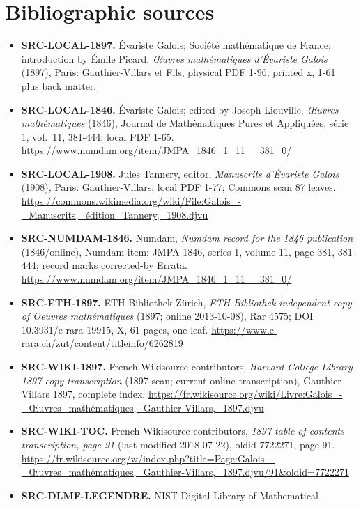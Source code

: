 \documentclass[
  10pt,
  a4paper,
]{scrreprt}
\providecommand{\tightlist}{%
  \setlength{\itemsep}{0pt}\setlength{\parskip}{0pt}}
\begin{document}
\section{Bibliographic sources}\label{bibliographic-sources}

\begin{itemize}
\tightlist
\item
  \textbf{SRC-LOCAL-1897.} Évariste Galois; Société mathématique de
  France; introduction by Émile Picard, \emph{Œuvres mathématiques
  d'Évariste Galois} (1897), Paris: Gauthier-Villars et Fils, physical
  PDF 1-96; printed x, 1-61 plus back matter.
\item
  \textbf{SRC-LOCAL-1846.} Évariste Galois; edited by Joseph Liouville,
  \emph{Œuvres mathématiques} (1846), Journal de Mathématiques Pures et
  Appliquées, série 1, vol.~11, 381-444; local PDF 1-65.
  \url{https://www.numdam.org/item/JMPA_1846_1_11__381_0/}
\item
  \textbf{SRC-LOCAL-1908.} Jules Tannery, editor, \emph{Manuscrits
  d'Évariste Galois} (1908), Paris: Gauthier-Villars, local PDF 1-77;
  Commons scan 87 leaves.
  \url{https://commons.wikimedia.org/wiki/File:Galois_-_Manuscrits,_édition_Tannery,_1908.djvu}
\item
  \textbf{SRC-NUMDAM-1846.} Numdam, \emph{Numdam record for the 1846
  publication} (1846/online), Numdam item: JMPA 1846, series 1, volume
  11, page 381, 381-444; record marks corrected-by Errata.
  \url{https://www.numdam.org/item/JMPA_1846_1_11__381_0/}
\item
  \textbf{SRC-ETH-1897.} ETH-Bibliothek Zürich, \emph{ETH-Bibliothek
  independent copy of Oeuvres mathématiques} (1897; online 2013-10-08),
  Rar 4575; DOI 10.3931/e-rara-19915, X, 61 pages, one leaf.
  \url{https://www.e-rara.ch/zut/content/titleinfo/6262819}
\item
  \textbf{SRC-WIKI-1897.} French Wikisource contributors, \emph{Harvard
  College Library 1897 copy transcription} (1897 scan; current online
  transcription), Gauthier-Villars 1897, complete index.
  \url{https://fr.wikisource.org/wiki/Livre:Galois_-_Œuvres_mathématiques,_Gauthier-Villars,_1897.djvu}
\item
  \textbf{SRC-WIKI-TOC.} French Wikisource contributors, \emph{1897
  table-of-contents transcription, page 91} (last modified 2018-07-22),
  oldid 7722271, page 91.
  \url{https://fr.wikisource.org/w/index.php?title=Page:Galois_-_Œuvres_mathématiques,_Gauthier-Villars,_1897.djvu/91&oldid=7722271}
\item
  \textbf{SRC-DLMF-LEGENDRE.} NIST Digital Library of Mathematical

\end{itemize}
\end{document}
